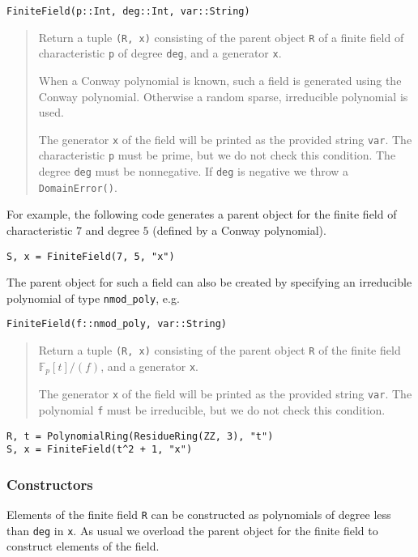 \documentclass[a4paper,10pt]{article}
\newcommand{\F}{\mathbb{F}}
\newcommand{\code}{\lstinline}
\newcommand{\desc}[1]{\vspace{-3mm}\begin{quote}#1\end{quote}}
\begin{document}
{{\begin{lstlisting}
FiniteField(p::Int, deg::Int, var::String)
\end{lstlisting}

\desc{Return a tuple \code{(R, x)} consisting of the parent object \code{R} of
a finite field of characteristic \code{p} of degree \code{deg}, and a
generator \code{x}.

When a Conway polynomial is known, such a field is generated using the
Conway polynomial. Otherwise a random sparse, irreducible polynomial is used.

The generator \code{x} of the field will be printed as the provided string
\code{var}. The characteristic \code{p} must be prime, but we do not check this
condition. The degree \code{deg} must be nonnegative. If \code{deg} is negative
we throw a \code{DomainError()}.}

For example, the following code generates a parent object for the finite field
of characteristic $7$ and degree $5$ (defined by a Conway polynomial).

\begin{lstlisting}
S, x = FiniteField(7, 5, "x")
\end{lstlisting}

The parent object for such a field can also be created by specifying
an irreducible polynomial of type \code{nmod_poly}, e.g.

\begin{lstlisting}
FiniteField(f::nmod_poly, var::String)
\end{lstlisting}

\desc{Return a tuple \code{(R, x)} consisting of the parent object \code{R} of
the finite field $\F_p[t]/(f)$, and a generator \code{x}.

The generator \code{x} of the field will be printed as the provided string
\code{var}. The polynomial \code{f} must be irreducible, but we do not check this
condition.}

\begin{lstlisting}
R, t = PolynomialRing(ResidueRing(ZZ, 3), "t")
S, x = FiniteField(t^2 + 1, "x")
\end{lstlisting}

\subsubsection{Constructors}

Elements of the finite field \code{R} can be constructed as polynomials of
degree less than \code{deg} in \code{x}. As usual we overload the parent object
for the finite field to construct elements of the field.

}}
\end{document}
